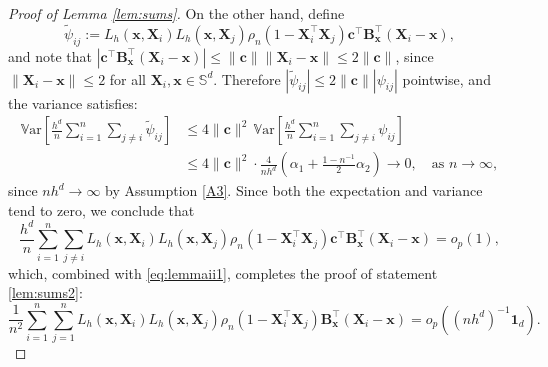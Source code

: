 \documentclass[12pt]{report} %
\newcommand{\bX}{\mathbf{X}}
\newcommand{\bx}{\mathbf{x}}
\newcommand{\bc}{\mathbf{c}}
\newcommand{\Sd}{\mathbb{S}^{d}}
\newcommand{\bB}{\mathbf{B}}
\newcommand{\lc}{\left[}
\newcommand{\rc}{\right]}
\newcommand{\V}[1]{\mathbb{V}\mathrm{ar}\lc #1\rc}
\begin{document}
\begin{proof}[Proof of Lemma \ref{lem:sums}]
On the other hand, define 
\begin{equation*}
\widetilde{\psi}_{ij} := L_h\left(\bx, \bX_i\right)L_h\left(\bx, \bX_j\right)
\rho_n\left(1-\bX_i^\top\bX_j\right)\bc^\top\bB_{\bx}^\top\left(\bX_i -\bx\right),
\end{equation*}
and note that $\left|\bc^\top\bB_{\bx}^\top\left(\bX_i - \bx\right)\right| 
\leq \|\bc\|\|\bX_i - \bx\| \leq 2\|\bc\|$, since $\|\bX_i - \bx\| \leq 2$ for all $\bX_i, \bx \in \Sd$. Therefore $|\widetilde{\psi}_{ij}| \leq 2\|\bc\||\psi_{ij}|$ pointwise, and the variance satisfies:
\begin{align*}
\V{\frac{h^d}{n}\sum_{i=1}^n\sum_{j\neq i}\widetilde{\psi}_{ij}}
&\leq 4\|\bc\|^2\,\V{\frac{h^d}{n}\sum_{i=1}^n\sum_{j\neq i}\psi_{ij}}\\
&\leq 4\|\bc\|^2\cdot\frac{4}{nh^d}\left(\alpha_1 + \frac{1-n^{-1}}{2}\alpha_2\right) 
\longrightarrow 0, \quad \text{as } n \to \infty,
\end{align*}
since $nh^d\to\infty$ by Assumption \ref{A3}. Since both the expectation and variance tend to zero, we conclude that
\begin{equation*}
\frac{h^d}{n}\sum_{i=1}^n\sum_{j\neq i}
L_h\left(\bx, \bX_i\right)L_h\left(\bx, \bX_j\right)
\rho_n\left(1-\bX_i^\top\bX_j\right)
\bc^\top\bB_{\bx}^\top\left(\bX_i -\bx\right) = o_p(1),
\end{equation*}
which, combined with \eqref{eq:lemmaii1}, completes the proof of statement \ref{lem:sums2}:
\begin{equation*}
\frac{1}{n^2}\sum_{i=1}^n\sum_{j=1}^n
L_h\left(\bx, \bX_i\right)L_h\left(\bx, \bX_j\right)
\rho_n\left(1-\bX_i^\top\bX_j\right)
\bB_{\bx}^\top\left(\bX_i -\bx\right)
= o_p\!\left(\left(nh^d\right)^{-1}\mathbf{1}_d\right).
\end{equation*}



\end{proof}
\end{document}
